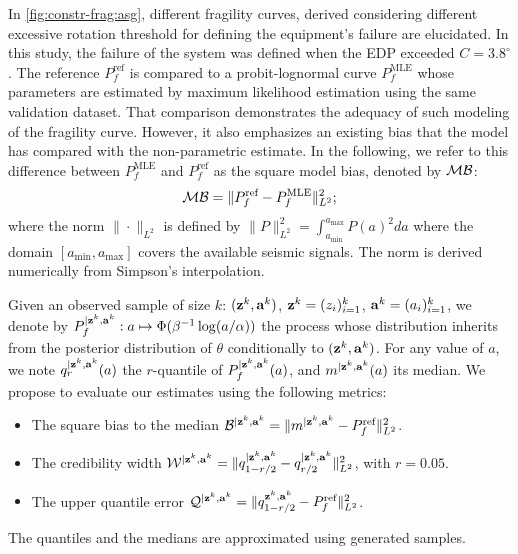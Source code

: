 In \cref{fig:constr-frag:asg},
different fragility curves, derived considering different excessive rotation threshold for defining the equipment's failure are elucidated. 
In this study, the failure of the system was defined when the EDP exceeded $C=3.8^\circ$.
The reference $P^{\text{ref}}_f$ is compared to a probit-lognormal curve $P^{\text{MLE}}_f$ whose parameters are estimated by maximum likelihood estimation using the same validation dataset.
That comparison demonstrates the adequacy of such modeling of the fragility curve. However, it also emphasizes an existing bias that the model has compared with the non-parametric estimate. In the following, we refer to this difference between $P_f^{\text{MLE}}$ and $P_f^{\text{ref}}$ as the square model bias, denoted by $\mathcal{M}\mathcal{B}$:
\begin{equation}
    \mathcal{M}\mathcal{B} = \|P^{\text{ref}}_f - P^{\text{MLE}}_f  \|_{L^2}^2;
\end{equation}
where the norm $\|\cdot \|_{L^2}$ is defined by $\|P\|_{L^2}^2=\int_{a_{\min}}^{a_{\max}} P(a)^2da$ where the domain $[a_{\min},a_{\max}]
$ covers the available seismic signals. The norm is derived numerically from Simpson's interpolation. %




Given an observed sample of size $k$: $(\mathbf{z}^k,\mathbf{a}^k)$, $\mathbf{z}^k=(z_i)_{i=1}^k$, $\mathbf{a}^k=(a_i)_{i=1}^k$, we denote by $P_f^{|\mathbf{z}^k,\mathbf{a}^k}:a\mapsto \Phi(\beta^{-1}\log (a/\alpha))$ the process whose distribution inherits from the posterior distribution  of $\theta$ conditionally to $(\mathbf{z}^k,\mathbf{a}^k)$. For any value of $a$, we note $q_{r}^{|\mathbf{z}^k,\mathbf{a}^k}(a)$ the $r$-quantile of $P^{|\mathbf{z}^k,\mathbf{a}^k}_f(a)$, and $m^{|\mathbf{z}^k,\mathbf{a}^k}(a)$ its median.
We propose to evaluate our estimates using the following metrics:
\begin{itemize}
    \item The square bias to the median $\mathcal{B}^{|\mathbf{z}^k,\mathbf{a}^k}=\|m^{|\mathbf{z}^k,\mathbf{a}^k}-P^{\text{ref}}_f\|^2_{L^2}$.
    \item The credibility width $\mathcal{W}^{|\mathbf{z}^k,\mathbf{a}^k}=\|q_{1-r/2}^{|\mathbf{z}^k,\mathbf{a}^k} - q_{r/2}^{|\mathbf{z}^k,\mathbf{a}^k}\|^2_{L^2}$, with $r=0.05$.
    \item The upper quantile error $\mathcal{Q}^{|\mathbf{z}^k,\mathbf{a}^k}=\|q_{1-r/2}^{\mathbf{z}^k,\mathbf{a}^k}-P_f^{\text{ref}} \|^2_{L^2}$.
\end{itemize}
%
The quantiles and the medians are approximated using generated samples.









